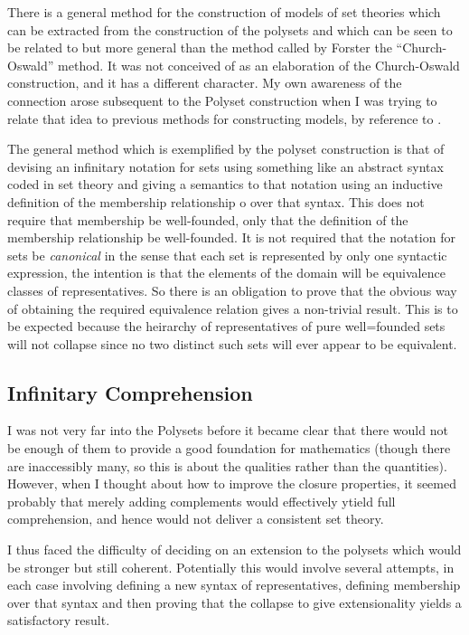 \documentclass{article}
\begin{document}
\begin{article}
There is a general method for the construction of models of set theories which can be extracted from the construction of the polysets and which can be seen to be related to but more general than the method called by Forster the ``Church-Oswald'' method.
It was not conceived of as an elaboration of the Church-Oswald construction, and it has a different character.
My own awareness of the connection arose subsequent to the Polyset construction when I was trying to relate that idea to previous methods for constructing models, by reference to \cite{forster92}.

The general method which is exemplified by the polyset construction is that of devising an infinitary notation for sets using something like an abstract syntax coded in set theory and giving a semantics to that notation using an inductive definition of the membership relationship o over that syntax.
This does not require that membership be well-founded, only that the definition of the membership relationship be well-founded.
It is not required that the notation for sets be \emph{canonical} in the sense that each set is represented by only one syntactic expression, the intention is that the elements of the domain will be equivalence classes of representatives.
So there is an obligation to prove that the obvious way of obtaining the required equivalence relation gives a non-trivial result.
This is to be expected because the heirarchy of representatives of pure well=founded sets will not collapse since no two distinct such sets will ever appear to be equivalent.

\subsection{Infinitary Comprehension}

I was not very far into the Polysets before it became clear that there would not be enough of them to provide a good foundation for mathematics (though there are inaccessibly many, so this is about the qualities rather than the quantities).
However, when I thought about how to improve the closure properties, it seemed probably that merely adding complements would effectively ytield full comprehension, and hence would not deliver a consistent set theory.

I thus faced the difficulty of deciding on an extension to the polysets which would be stronger but still coherent.
Potentially this would involve several attempts, in each case involving defining a new syntax of representatives, defining membership over that syntax and then proving that the collapse to give extensionality yields a satisfactory result.


\end{article}
\end{document}
